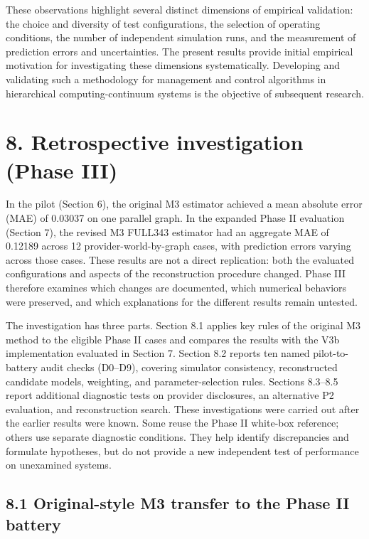 \documentclass[10pt,a4paper]{article}
\begin{document}
These observations highlight several distinct dimensions of empirical validation: the choice and diversity of test configurations, the selection of operating conditions, the number of independent simulation runs, and the measurement of prediction errors and uncertainties. The present results provide initial empirical motivation for investigating these dimensions systematically. Developing and validating such a methodology for management and control algorithms in hierarchical computing-continuum systems is the objective of subsequent research.

\section*{8. Retrospective investigation (Phase III)}

In the pilot (Section 6), the original M3 estimator achieved a mean absolute error (MAE) of 0.03037 on one parallel graph. In the expanded Phase II evaluation (Section 7), the revised M3 FULL343 estimator had an aggregate MAE of 0.12189 across 12 provider-world-by-graph cases, with prediction errors varying across those cases. These results are not a direct replication: both the evaluated configurations and aspects of the reconstruction procedure changed. Phase III therefore examines which changes are documented, which numerical behaviors were preserved, and which explanations for the different results remain untested.

The investigation has three parts. Section 8.1 applies key rules of the original M3 method to the eligible Phase II cases and compares the results with the V3b implementation evaluated in Section 7. Section 8.2 reports ten named pilot-to-battery audit checks (D0--D9), covering simulator consistency, reconstructed candidate models, weighting, and parameter-selection rules. Sections 8.3--8.5 report additional diagnostic tests on provider disclosures, an alternative P2 evaluation, and reconstruction search. These investigations were carried out after the earlier results were known. Some reuse the Phase II white-box reference; others use separate diagnostic conditions. They help identify discrepancies and formulate hypotheses, but do not provide a new independent test of performance on unexamined systems.

\subsection*{8.1 Original-style M3 transfer to the Phase II battery}
\end{document}
